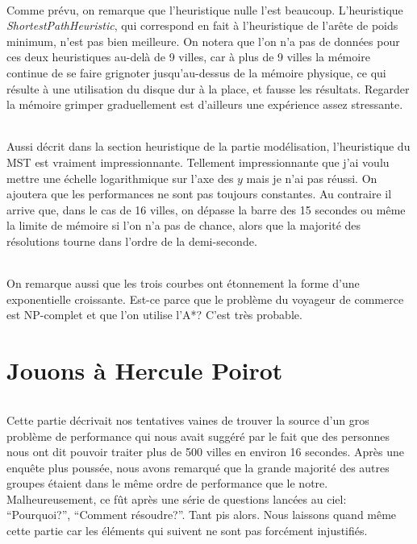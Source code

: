 \documentclass[french]{article}
\begin{document}
\paragraph{} Comme prévu, on remarque que l'heuristique nulle l'est beaucoup.
L'heuristique \emph{ShortestPathHeuristic}, qui correspond en fait à
l'heuristique de l'arête de poids minimum, n'est pas bien meilleure. On notera
que l'on n'a pas de données pour ces deux heuristiques au-delà de 9 villes, car
à plus de 9 villes la mémoire continue de se faire grignoter jusqu'au-dessus de
la mémoire physique, ce qui résulte à une utilisation du disque dur à la place,
et fausse les résultats. Regarder la mémoire grimper graduellement est
d'ailleurs une expérience assez stressante.

\paragraph{} Aussi décrit dans la section heuristique de la partie
modélisation, l'heuristique du MST est vraiment impressionnante. Tellement
impressionnante que j'ai voulu mettre une échelle logarithmique sur l'axe des
$y$ mais je n'ai pas réussi. On ajoutera que les performances ne sont pas
toujours constantes. Au contraire il arrive que, dans le cas de 16 villes, on
dépasse la barre des 15 secondes ou même la limite de mémoire si l'on n'a pas
de chance, alors que la majorité des résolutions tourne dans l'ordre de la
demi-seconde.

\paragraph{} On remarque aussi que les trois courbes ont étonnement la forme
d'une exponentielle croissante. Est-ce parce que le problème du voyageur de
commerce est NP-complet et que l'on utilise l'A*? C'est très probable.

\part{Jouons à Hercule Poirot}

\paragraph{} Cette partie décrivait nos tentatives vaines de trouver la source
d'un gros problème de performance qui nous avait suggéré par le fait que des
personnes nous ont dit pouvoir traiter plus de 500 villes en environ 16
secondes. Après une enquête plus poussée, nous avons remarqué que la grande
majorité des autres groupes étaient dans le même ordre de performance que le
notre. Malheureusement, ce fût après une série de questions lancées au ciel:
``Pourquoi?'', ``Comment résoudre?''. Tant pis alors. Nous laissons quand même
cette partie car les éléments qui suivent ne sont pas forcément injustifiés.
\end{document}
